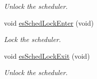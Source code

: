 \begin{DoxyCompactItemize}
\begin{DoxyCompactList}\small\item\em Unlock the scheduler. \end{DoxyCompactList}\item 
void \hyperlink{group__kern__intf_ga4b70a0e213b791b4e51840352d144a22}{es\-Sched\-Lock\-Enter} (void)
\begin{DoxyCompactList}\small\item\em Lock the scheduler. \end{DoxyCompactList}\item 
void \hyperlink{group__kern__intf_gac4c263203fcf700d96fe21782cfde219}{es\-Sched\-Lock\-Exit} (void)
\begin{DoxyCompactList}\small\item\em Unlock the scheduler. \end{DoxyCompactList}\end{DoxyCompactItemize}
